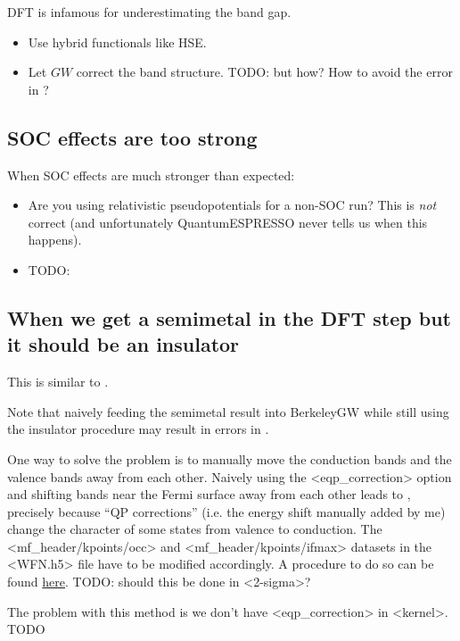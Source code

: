 \documentclass[hyperref, a4paper, 12pt]{report}
\def\texttt#1{<#1>}%
\newcommand{\shortcode}[1]{\texttt{#1}}
\begin{document}
DFT is infamous for underestimating the band gap.

\begin{itemize}
    \item Use hybrid functionals like HSE.
    \item Let $GW$ correct the band structure. TODO: but how? How to avoid the error in ?
\end{itemize}

\subsection{SOC effects are too strong}

When SOC effects are much stronger than expected: 
\begin{itemize}
    \item Are you using relativistic pseudopotentials for a non-SOC run?
        This is \emph{not} correct 
        (and unfortunately QuantumESPRESSO never tells us when this happens).
    \item TODO: 
\end{itemize}

\subsection{When we get a semimetal in the DFT step but it should be an insulator}\label{sec:unexpected-metal}

This is similar to .

Note that naively feeding the semimetal result into BerkeleyGW 
while still using the insulator procedure
may result in errors in . 

One way to solve the problem is 
to manually move the conduction bands and the valence bands away from each other.
Naively using the \shortcode{eqp_correction} option 
and shifting bands near the Fermi surface away from each other 
leads to ,
precisely because 
``QP corrections'' (i.e. the energy shift manually added by me) 
change the character of some states from valence to conduction.
The \shortcode{mf_header/kpoints/occ} and \shortcode{mf_header/kpoints/ifmax} datasets 
in the \shortcode{WFN.h5} file 
have to be modified accordingly.
A procedure to do so can be found \href{./scripts/wfn-editing/move-occupation.jl}{here}.
TODO: should this be done in \shortcode{2-sigma}?

The problem with this method is we don't have \shortcode{eqp_correction} in \shortcode{kernel}. TODO 
\end{document}
